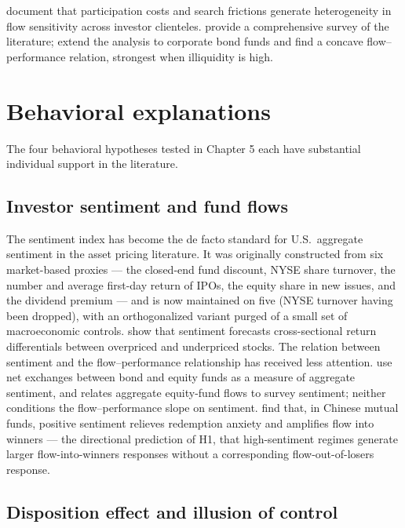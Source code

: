 \documentclass[12pt, oneside]{report}
\begin{document}
\textcite{HuangWeiYan2007} document that participation costs and search
frictions generate heterogeneity in flow sensitivity across investor
clienteles. \textcite{ChristoffersenMustoWermers2014} provide a
comprehensive survey of the literature; \textcite{Goldstein2017} extend
the analysis to corporate bond funds and find a concave flow--performance
relation, strongest when illiquidity is high.

\section{Behavioral explanations}
\label{sec:behavioral_lit}

\noindent The four behavioral hypotheses tested in Chapter 5 each have
substantial individual support in the literature.

\subsection{Investor sentiment and fund flows}
\label{sec:sentiment_lit}

\noindent The \textcite{BakerWurgler2006,BakerWurgler2007} sentiment index
has become the de facto standard for U.S.\ aggregate sentiment in the
asset pricing literature. It was originally constructed from six
market-based proxies --- the closed-end fund discount, NYSE share
turnover, the number and average first-day return of IPOs, the equity
share in new issues, and the dividend premium --- and is now maintained on
five (NYSE turnover having been dropped), with an orthogonalized variant
purged of a small set of macroeconomic controls.
\textcite{StambaughYuYuan2012} show that sentiment forecasts
cross-sectional return differentials between overpriced and underpriced
stocks. The relation between sentiment and the flow--performance
relationship has received less attention.
\textcite{BenRephaelKandelWohl2012} use net exchanges between bond and
equity funds as a measure of aggregate sentiment, and
\textcite{IndroSentiment2004} relates aggregate equity-fund flows to survey
sentiment; neither conditions the flow--performance slope on sentiment.
\textcite{WuZhang2024} find that, in Chinese mutual funds, positive
sentiment relieves redemption anxiety and amplifies flow into winners ---
the directional prediction of H1, that high-sentiment regimes generate
larger flow-into-winners responses without a corresponding
flow-out-of-losers response.

\subsection{Disposition effect and illusion of control}
\label{sec:disposition_lit}
\end{document}

